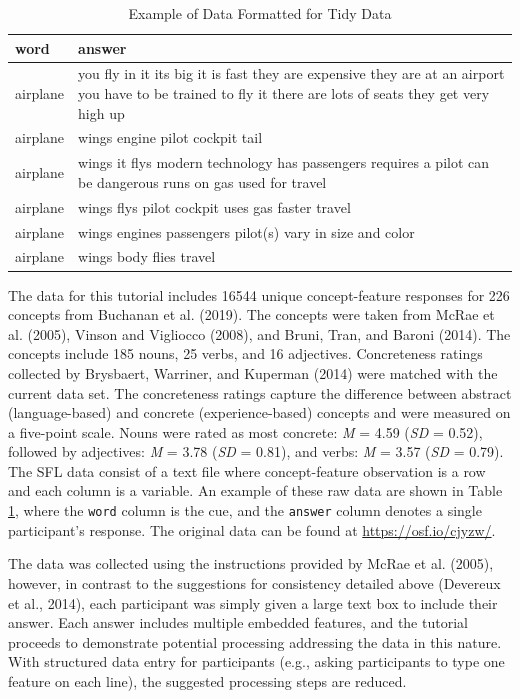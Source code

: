 \documentclass[man]{apa6}
\begin{document}
\begin{table}[t]

\caption{\label{tab:tab1}Example of Data Formatted for Tidy Data}
\centering
\begin{tabular}{l>{\raggedright\arraybackslash}p{30em}}
\toprule
word & answer\\
\midrule
airplane & you fly in it  its big  it is fast  they are expensive  they are at an airport  you have to be trained to fly it  there are lots of seats  they get very high up\\
airplane & wings engine pilot cockpit tail\\
airplane & wings  it flys  modern technology  has passengers  requires a pilot  can be dangerous  runs on gas  used for travel\\
airplane & wings  flys  pilot  cockpit  uses gas  faster travel\\
airplane & wings  engines  passengers  pilot(s)  vary in size and color\\
\addlinespace
airplane & wings  body  flies  travel\\
\bottomrule
\end{tabular}
\end{table}

The data for this tutorial includes 16544 unique concept-feature responses for 226 concepts from Buchanan et al. (2019). The concepts were taken from McRae et al. (2005), Vinson and Vigliocco (2008), and Bruni, Tran, and Baroni (2014). The concepts include 185 nouns, 25 verbs, and 16 adjectives. Concreteness ratings collected by Brysbaert, Warriner, and Kuperman (2014) were matched with the current data set. The concreteness ratings capture the difference between abstract (language-based) and concrete (experience-based) concepts and were measured on a five-point scale. Nouns were rated as most concrete: \emph{M} = 4.59 (\emph{SD} = 0.52), followed by adjectives: \emph{M} = 3.78 (\emph{SD} = 0.81), and verbs: \emph{M} = 3.57 (\emph{SD} = 0.79). The SFL data consist of a text file where concept-feature observation is a row and each column is a variable. An example of these raw data are shown in Table \ref{tab:tab1}, where the \texttt{word} column is the cue, and the \texttt{answer} column denotes a single participant's response. The original data can be found at \url{https://osf.io/cjyzw/}.

The data was collected using the instructions provided by McRae et al. (2005), however, in contrast to the suggestions for consistency detailed above (Devereux et al., 2014), each participant was simply given a large text box to include their answer. Each answer includes multiple embedded features, and the tutorial proceeds to demonstrate potential processing addressing the data in this nature. With structured data entry for participants (e.g., asking participants to type one feature on each line), the suggested processing steps are reduced.
\end{document}

